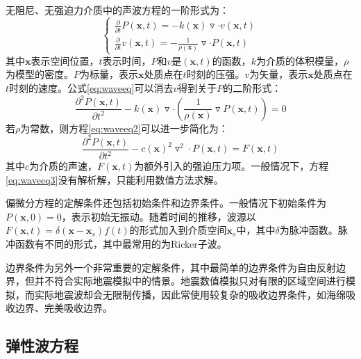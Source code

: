 无阻尼、无强迫力介质中的声波方程的一阶形式为：
\begin{equation}
\left\{\begin{matrix}
\frac{\partial}{\partial t}P(\textbf{x},t) = -k(\textbf{x}) \triangledown \cdot v(\textbf{x}, t) \\
\frac{\partial}{\partial t}v(\textbf{x},t) = -\frac{1}{\rho(\textbf{x})} \triangledown \cdot P(\textbf{x}, t)
\end{matrix}\right.
\label{eq:waveeq}
\end{equation}
其中$\textbf{x}$表示空间位置，$t$表示时间，$P$和$v$是$(\textbf{x},t)$的函数，$k$为介质的体积模量，$\rho$为模型的密度。$P$为标量，表示$\textbf{x}$处质点在$t$时刻的压强。$v$为矢量，表示$\textbf{x}$处质点在$t$时刻的速度。公式\ref{eq:waveeq}可以消去$v$得到关于$P$的二阶形式：
\begin{equation}
  \frac{\partial ^2P(\textbf{x},t)}{\partial t^2} - k(\textbf{x})\triangledown \cdot (\frac{1}{\rho(\textbf{x})} \triangledown P(\textbf{x},t))=0
  \label{eq:waveeq2}
\end{equation}
若$\rho$为常数，则方程\ref{eq:waveeq2}可以进一步简化为：
\begin{equation}
    \frac{\partial ^2P(\textbf{x},t)}{\partial t^2} - c(\textbf{x})^2\triangledown ^2 \cdot P(\textbf{x},t)=F(\textbf{x}, t)
  \label{eq:waveeq3}
\end{equation}
其中$c$为介质的声速，$F(\textbf{x}, t)$为额外引入的强迫压力项。一般情况下，方程\ref{eq:waveeq3}没有解析解，只能利用数值方法求解。

偏微分方程的定解条件还包括初始条件和边界条件。一般情况下初始条件为$P(\textbf{x},0)=0$，表示初始无振动。随着时间的推移，波源以$F(\textbf{x},t)=\delta(\textbf{x}-\textbf{x}_s)f(t)$的形式加入到介质空间$\textbf{x}_s$中，其中$\delta$为脉冲函数。脉冲函数有不同的形式，其中最常用的为Ricker子波。

边界条件为另外一个非常重要的定解条件，其中最简单的边界条件为自由反射边界，但并不符合实际地震模拟中的情景。地震数值模拟只对有限的区域空间进行模拟，而实际地震波却会无限制传播，因此常使用较复杂的吸收边界条件，如海绵吸收边界\cite{cerjan1985nonreflecting}、完美吸收边界\cite{berenger1994perfectly}。


\subsection{弹性波方程}

